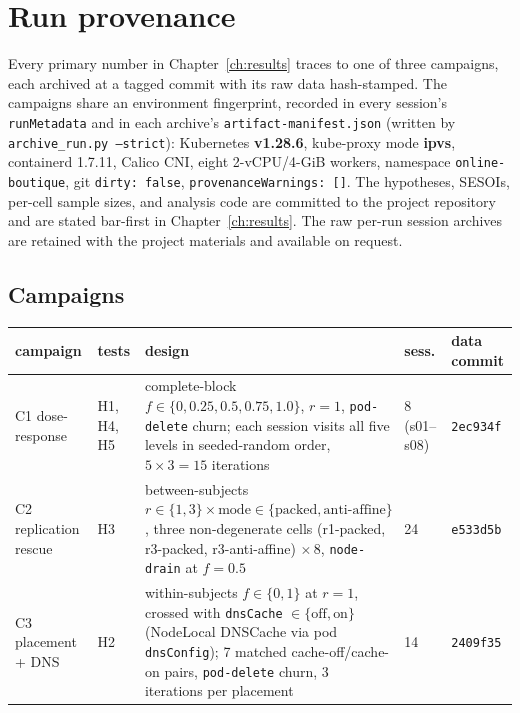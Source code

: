 
\chapter{Run provenance}\label{app:provenance}

Every primary number in Chapter~\ref{ch:results} traces to one of three
campaigns, each archived at a tagged commit with its raw data hash-stamped. The
campaigns share an environment fingerprint, recorded
in every session's \texttt{runMetadata} and in each archive's
\texttt{artifact-manifest.json} (written by \texttt{archive\_run.py --strict}):
Kubernetes \textbf{v1.28.6}, kube-proxy mode \textbf{ipvs}, containerd 1.7.11,
Calico CNI, eight 2-vCPU/4-GiB workers, namespace \texttt{online-boutique}, git
\texttt{dirty: false}, \texttt{provenanceWarnings: []}. The hypotheses, SESOIs,
per-cell sample sizes, and analysis code are committed to the project
repository and are stated bar-first in Chapter~\ref{ch:results}. The raw per-run session archives are
retained with the project materials and available on request.

\section{Campaigns}\label{sec:campaigns}

\begin{center}
\footnotesize
\setlength{\tabcolsep}{4pt}
\begin{tabular}{p{}p{}p{}p{}p{}}
\toprule
\textbf{campaign} & \textbf{tests} & \textbf{design} & \textbf{sess.} & \textbf{data commit} \\
\midrule
C1 dose-response & H1, H4, H5 & complete-block $f \in \{0, 0.25, 0.5, 0.75, 1.0\}$, $r{=}1$, \texttt{pod-delete} churn; each session visits all five levels in seeded-random order, $5\times3 = 15$ iterations & 8 (s01--s08) & \texttt{2ec934f} \\
\addlinespace
C2 replication rescue & H3 & between-subjects $r \in \{1,3\} \times \text{mode} \in \{\text{packed}, \text{anti-affine}\}$, three non-degenerate cells (r1-packed, r3-packed, r3-anti-affine) $\times\,8$, \texttt{node-drain} at $f{=}0.5$ & 24 & \texttt{e533d5b} \\
\addlinespace
C3 placement + DNS & H2 & within-subjects $f \in \{0,1\}$ at $r{=}1$, crossed with \texttt{dnsCache} $\in \{\text{off}, \text{on}\}$ (NodeLocal DNSCache via pod \texttt{dnsConfig}); 7 matched cache-off/cache-on pairs, \texttt{pod-delete} churn, 3 iterations per placement & 14 & \texttt{2409f35} \\
\bottomrule
\end{tabular}
\end{center}

